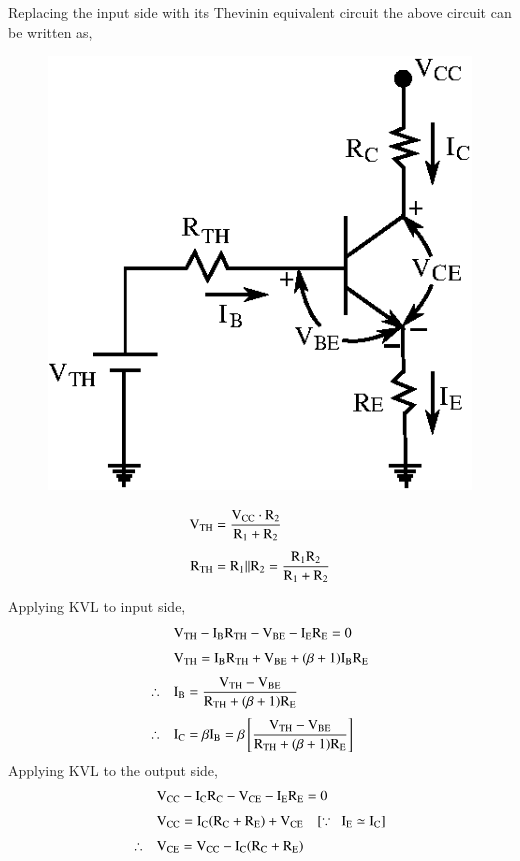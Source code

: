Replacing the input side with its Thevinin equivalent circuit the above circuit can be written as,
\begin{figure}[H]
\centering
\includegraphics{chap3/fig3.22.eps}
\end{figure}
\begin{align*}
\textrm{V}_{\text{TH}} &= \frac{\textrm{V}_{\text{CC}}\cdot \textrm{R}_{2}}{\textrm{R}_{1}+\textrm{R}_{2}}\\[4pt]
\textrm{R}_{\text{TH}} &= \textrm{R}_{1} || \textrm{R}_{2}=\frac{\textrm{R}_{1}\textrm{R}_{2}}{\textrm{R}_{1}+\textrm{R}_{2}}
\end{align*}

Applying KVL to input side,
\begin{align*}
& \textrm{V}_{\text{TH}} - \textrm{I}_{\textrm{B}}\textrm{R}_{\text{TH}}-\textrm{V}_{\text{BE}}-\textrm{I}_{\textrm{E}}\textrm{R}_{\textrm{E}}=0\\[3pt]
& \textrm{V}_{\text{TH}} = \textrm{I}_{\textrm{B}}\textrm{R}_{\text{TH}}+\textrm{V}_{\text{BE}}+(\beta+1)\textrm{I}_{\textrm{B}}\textrm{R}_{\textrm{E}}\\[3pt]
\therefore\quad & \textrm{I}_{\textrm{B}} = \frac{\textrm{V}_{\text{TH}}-\textrm{V}_{\text{BE}}}{\textrm{R}_{\text{TH}}+(\beta+1)\textrm{R}_{\textrm{E}}}\\[3pt]
\therefore\quad & \textrm{I}_{\textrm{C}} = \beta \textrm{I}_{\textrm{B}}=\beta\left[\frac{\textrm{V}_{\text{TH}}-\textrm{V}_{\text{BE}}}{\textrm{R}_{\text{TH}}+(\beta+1)\textrm{R}_{\textrm{E}}}\right]
\end{align*}
Applying KVL to the output side,
\begin{align*}
& \textrm{V}_{\text{CC}}-\textrm{I}_{\textrm{C}}\textrm{R}_{\textrm{C}}-\textrm{V}_{\text{CE}}-\textrm{I}_{\textrm{E}}\textrm{R}_{\textrm{E}}=0\\[3pt]
& \textrm{V}_{\text{CC}}=\textrm{I}_{\textrm{C}}(\textrm{R}_{\textrm{C}}+\textrm{R}_{\textrm{E}})+\textrm{V}_{\text{CE}}\quad [\because ~~ \textrm{I}_{\textrm{E}}\simeq \textrm{I}_{\textrm{C}}]\\[3pt]
\therefore\quad & \textrm{V}_{\text{CE}}=\textrm{V}_{\text{CC}}-\textrm{I}_{\textrm{C}}(\textrm{R}_{\textrm{C}}+\textrm{R}_{\textrm{E}})
\end{align*}

